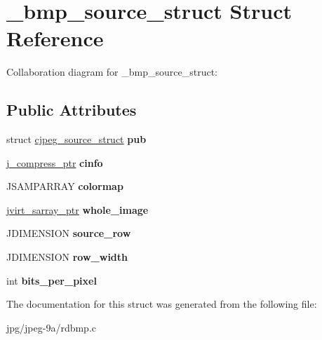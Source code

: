 \hypertarget{struct__bmp__source__struct}{\section{\+\_\+bmp\+\_\+source\+\_\+struct Struct Reference}
\label{struct__bmp__source__struct}
}


Collaboration diagram for \+\_\+bmp\+\_\+source\+\_\+struct\+:
\subsection*{Public Attributes}
\begin{DoxyCompactItemize}
\item 
\hypertarget{struct__bmp__source__struct_a776299f00c01dd117f0f6eeed1752102}{struct \hyperlink{structcjpeg__source__struct}{cjpeg\+\_\+source\+\_\+struct} {\bfseries pub}}\label{struct__bmp__source__struct_a776299f00c01dd117f0f6eeed1752102}

\item 
\hypertarget{struct__bmp__source__struct_a63668ea216df60038a6c05b4630efb9a}{\hyperlink{structjpeg__compress__struct}{j\+\_\+compress\+\_\+ptr} {\bfseries cinfo}}\label{struct__bmp__source__struct_a63668ea216df60038a6c05b4630efb9a}

\item 
\hypertarget{struct__bmp__source__struct_a9345a5edf4e47d49ce21801c548eb302}{J\+S\+A\+M\+P\+A\+R\+R\+A\+Y {\bfseries colormap}}\label{struct__bmp__source__struct_a9345a5edf4e47d49ce21801c548eb302}

\item 
\hypertarget{struct__bmp__source__struct_ab274fce593906c85fd41a66cc93712fa}{\hyperlink{structjvirt__sarray__control}{jvirt\+\_\+sarray\+\_\+ptr} {\bfseries whole\+\_\+image}}\label{struct__bmp__source__struct_ab274fce593906c85fd41a66cc93712fa}

\item 
\hypertarget{struct__bmp__source__struct_af3d5c50536076b241951cfe3155eff8c}{J\+D\+I\+M\+E\+N\+S\+I\+O\+N {\bfseries source\+\_\+row}}\label{struct__bmp__source__struct_af3d5c50536076b241951cfe3155eff8c}

\item 
\hypertarget{struct__bmp__source__struct_af48369f886a401fbf7dfa29fef8c4b6f}{J\+D\+I\+M\+E\+N\+S\+I\+O\+N {\bfseries row\+\_\+width}}\label{struct__bmp__source__struct_af48369f886a401fbf7dfa29fef8c4b6f}

\item 
\hypertarget{struct__bmp__source__struct_a04929a0473866ee869444c85ffc4d62d}{int {\bfseries bits\+\_\+per\+\_\+pixel}}\label{struct__bmp__source__struct_a04929a0473866ee869444c85ffc4d62d}

\end{DoxyCompactItemize}


The documentation for this struct was generated from the following file\+:\begin{DoxyCompactItemize}
\item 
jpg/jpeg-\/9a/rdbmp.\+c\end{DoxyCompactItemize}
